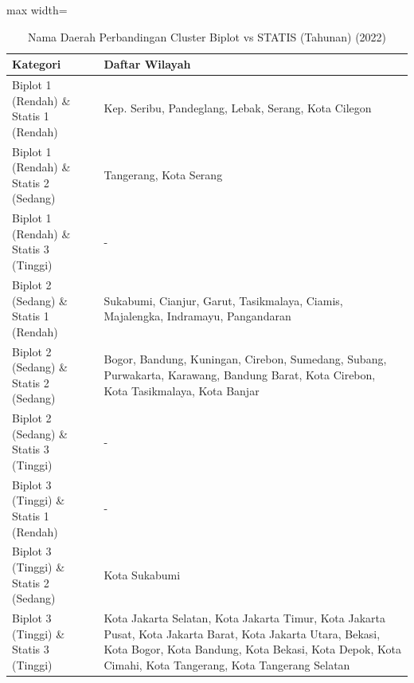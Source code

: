 \begin{table}[H]
\centering
\caption{Nama Daerah Perbandingan Cluster Biplot vs STATIS (Tahunan) (2022)} \label{tab:app1biplot_statis_comp_name_2022}
\begin{adjustbox}{max width=\textwidth}
\begin{tabular}{|p{4cm}|p{10cm}|}
\hline
\textbf{Kategori} & \textbf{Daftar Wilayah} \\
\hline
Biplot 1 (Rendah) \& Statis 1 (Rendah) & Kep. Seribu, Pandeglang, Lebak, Serang, Kota Cilegon \\
\hline
Biplot 1 (Rendah) \& Statis 2 (Sedang) & Tangerang, Kota Serang \\
\hline
Biplot 1 (Rendah) \& Statis 3 (Tinggi) & - \\
\hline
Biplot 2 (Sedang) \& Statis 1 (Rendah) & Sukabumi, Cianjur, Garut, Tasikmalaya, Ciamis, Majalengka, Indramayu, Pangandaran \\
\hline
Biplot 2 (Sedang) \& Statis 2 (Sedang) & Bogor, Bandung, Kuningan, Cirebon, Sumedang, Subang, Purwakarta, Karawang, Bandung Barat, Kota Cirebon, Kota Tasikmalaya, Kota Banjar \\
\hline
Biplot 2 (Sedang) \& Statis 3 (Tinggi) & - \\
\hline
Biplot 3 (Tinggi) \& Statis 1 (Rendah) & - \\
\hline
Biplot 3 (Tinggi) \& Statis 2 (Sedang) & Kota Sukabumi \\
\hline
Biplot 3 (Tinggi) \& Statis 3 (Tinggi) & Kota Jakarta Selatan, Kota Jakarta Timur, Kota Jakarta Pusat, Kota Jakarta Barat, Kota Jakarta Utara, Bekasi, Kota Bogor, Kota Bandung, Kota Bekasi, Kota Depok, Kota Cimahi, Kota Tangerang, Kota Tangerang Selatan \\
\hline
\end{tabular}
\end{adjustbox}
\end{table}